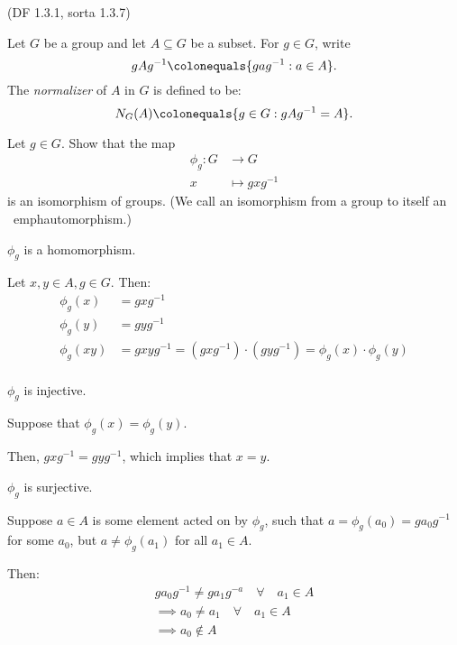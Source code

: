 \begin{problem}{\textsf{(DF 1.3.1, sorta 1.3.7)}}
  
  \noindent
  Let $G$ be a group and let $A \subseteq G$ be a subset.
  For $g \in G$, write \[ gAg^{-1} \colonequals \{gag^{-1} : a \in A\}. \]
  The \emph{normalizer} of $A$ in $G$ is defined to be:
  \[ N_G(A) \colonequals \{g \in G : gAg^{-1}= A\}. \]
  \begin{enumalph}
    \item Let $g \in G$.  Show that the map 
      \begin{align*}
        \phi_g \colon G &\to G \\
        x &\mapsto gxg^{-1}
        \end{align*}
      is an isomorphism of groups.  (We call an isomorphism from a group to itself an \
      emph{automorphism}.)
      \begin{Answer}
        \begin{enumroman}
          \item $\phi_g$ is a homomorphism.
            
            \noindent
            Let $x,y \in A, g \in G$. Then:
            \begin{align*}
              \phi_g(x) &= gxg^{-1} \\
              \phi_g(y) &= gyg^{-1} \\
              \phi_g(xy) &= gxyg^{-1} = (gxg^{-1}) \cdot (gyg^{-1}) = \phi_g(x) \cdot \phi_g(y) \\
            \end{align*}
          \item $\phi_g$ is injective.
            
              \noindent
              Suppose that $\phi_g(x) = \phi_g(y)$.

              \noindent
              Then, $gxg^{-1} = gyg^{-1}$, which implies that $x = y$.
          \item $\phi_g$ is surjective.
            
            \noindent
            Suppose $a \in A$ is some element acted on by $\phi_g$,
            such that $a = \phi_g(a_0) = ga_0g^{-1}$ for some $a_0$,
            but $a \neq \phi_g(a_1)$ for all $a_1 \in A$.
            
            \noindent
            Then:
            \begin{align*}
              ga_0g^{-1} \neq ga_1g^{-a} \quad \forall \quad a_1 \in A \\
              \implies a_0 \neq a_1 \quad \forall \quad a_1 \in A \\
              \implies a_0 \notin A \\
            \end{align*}


\end{enumroman}
\end{Answer}
\end{enumalph}
\end{problem}
